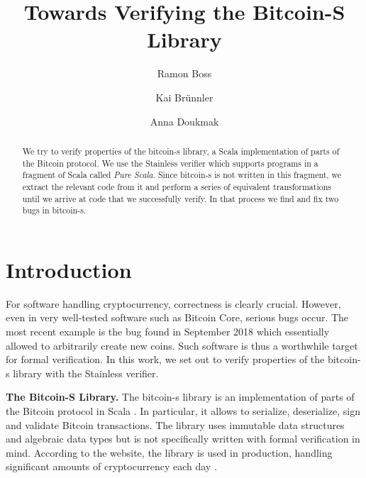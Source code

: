 \documentclass[runningheads]{llncs}
\renewcommand{\paragraph}{\textbf}%
\begin{document}
\title{Towards Verifying the Bitcoin-S Library}

\author{Ramon Boss \and Kai Brünnler \and Anna Doukmak}


\maketitle             

\begin{abstract}
  We try to verify properties of the bitcoin-s library, a Scala
  implementation of parts of the Bitcoin protocol. We use the
  Stainless verifier which supports programs in a fragment of Scala
  called \emph{Pure Scala}. Since bitcoin-s is not written in this
  fragment, we extract the relevant code from it and perform a series
  of equivalent transformations until we arrive at code that we
  successfully verify. In that process we find and fix two bugs in
  bitcoin-s.

\end{abstract}



\section{Introduction}

For software handling cryptocurrency, correctness is clearly crucial.
However, even in very well-tested software such as Bitcoin Core,
serious bugs occur. The most recent example is the bug found in
September 2018 \cite{cve201817144} which essentially allowed to
arbitrarily create new coins. Such software is thus a worthwhile
target for formal verification. In this work, we set out to verify
properties of the bitcoin-s library with the Stainless verifier.

\paragraph{The Bitcoin-S Library.} The bitcoin-s library is an
implementation of parts of the Bitcoin protocol in Scala
\cite{BitcoinS:website,BitcoinS:github}. In particular, it allows to
serialize, deserialize, sign and validate Bitcoin transactions. The
library uses immutable data structures and algebraic data types but is
not specifically written with formal verification in mind. According
to the website, the library is used in production, handling
significant amounts of cryptocurrency each day
\cite{BitcoinS:website}.
\end{document}
